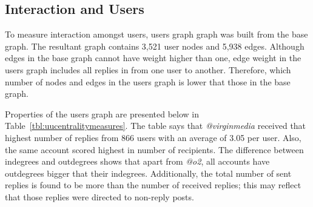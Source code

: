 \documentclass[sigconf]{acmart}
\begin{document}
{\subsection{Interaction and Users}


To measure interaction amongst users, users graph graph was built 
from the base graph. The resultant graph contains 3,521 user nodes 
and 5,938 edges. %
Although edges in the base graph cannot
have weight higher than one, edge weight in the users graph includes all 
replies in from one user to another. Therefore, which number of nodes and edges
in the users graph is lower that those in the base graph.


Properties of the users graph are presented below in Table~\ref{tbl:uucentralitymeasures}. 
The table says that {\emph{@virginmedia}} received that highest number of
replies from 866 users with an average of 3.05 per user. Also, the
same account scored highest in number of recipients. The difference
between indegrees and outdegrees shows that apart from {\emph{@o2}},
all accounts have outdegrees bigger that their
indegrees. Additionally, the total number of sent replies is found to
be more than the number of received replies; this may reflect that
those replies were directed to non-reply posts.

}
\end{document}
